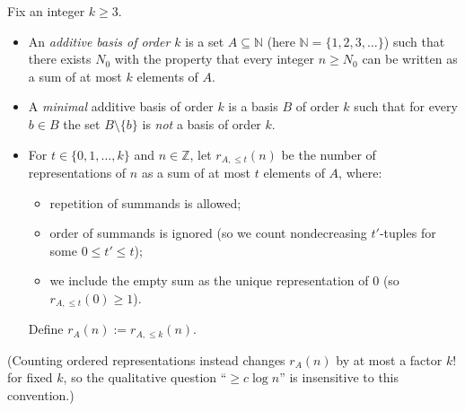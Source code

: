 Fix an integer $k\ge 3$.

\begin{itemize}
\item An \emph{additive basis of order $k$} is a set $A\subseteq\mathbb N$ (here $\mathbb N=\{1,2,3,\dots\}$) such that there exists $N_0$ with the property that every integer $n\ge N_0$ can be written as a sum of at most $k$ elements of $A$.
\item A \emph{minimal} additive basis of order $k$ is a basis $B$ of order $k$ such that for every $b\in B$ the set $B\setminus\{b\}$ is \emph{not} a basis of order $k$.
\item For $t\in\{0,1,\dots,k\}$ and $n\in\mathbb Z$, let $r_{A,\le t}(n)$ be the number of representations of $n$ as a sum of at most $t$ elements of $A$, where:
  \begin{itemize}
  \item repetition of summands is allowed;
  \item order of summands is ignored (so we count nondecreasing $t'$-tuples for some $0\le t'\le t$);
  \item we include the empty sum as the unique representation of $0$ (so $r_{A,\le t}(0)\ge 1$).
  \end{itemize}
  Define $r_A(n):=r_{A,\le k}(n)$.
\end{itemize}

(Counting ordered representations instead changes $r_A(n)$ by at most a factor $k!$ for fixed $k$, so the qualitative question ``$\ge c\log n$'' is insensitive to this convention.)
